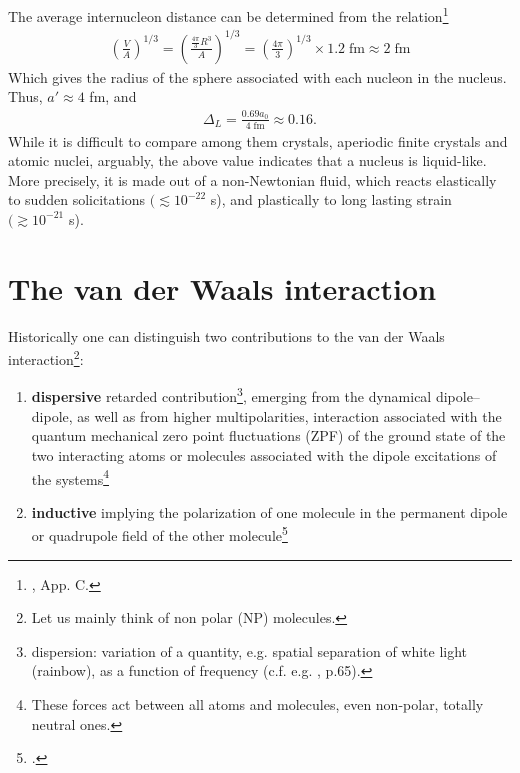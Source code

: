 \begin{subappendices}
The average internucleon distance can be determined from the relation\footnote{\cite{Brink:05}, App. C.}
\begin{align}
\left(\frac{V}{A}\right)^{1/3}=\left(\frac{\frac{4\pi}{3}R^3}{A}\right)^{1/3}=\left(\frac{4\pi}{3}\right)^{1/3}\times 1.2\; \text{fm}\approx 2\;\text{fm}
\end{align} 
Which gives the radius of the sphere associated with each nucleon in the nucleus. Thus, $a'\approx4$ fm, and 
\begin{align}
\Delta_L=\frac{0.69 a_0}{4\;\text{fm}}\approx0.16.
\end{align} 
While it is difficult to compare among them crystals, aperiodic finite crystals and atomic nuclei, arguably, the above value indicates that a nucleus is liquid-like. More precisely, it is made out of a non-Newtonian fluid, which reacts elastically to sudden so\-li\-ci\-ta\-tions $(\lesssim 10^{-22}$ s),  and plastically to long lasting strain $(\gtrsim 10^{-21}$ s). 

\section{The van der Waals interaction}\label{C2AppD}
Historically one can distinguish two contributions to the van der Waals interaction\footnote{Let us mainly think of non polar (NP) molecules.}: 
\begin{enumerate}
\item \textbf{dispersive} retarded contribution\footnote{dispersion: variation of a quantity, e.g. spatial separation of white light (rainbow), as a function of frequency (c.f. e.g. \cite{Israelachvili:85}, p.65).}, emerging from the dynamical dipole--dipole, as well as from higher multipolarities, interaction associated with the quantum mechanical zero point fluctuations (ZPF) of the ground state of the two interacting atoms or molecules associated with the dipole excitations of the systems\footnote{These forces act between all atoms and molecules, even non-polar, totally neutral ones.} 
\item \textbf{inductive} implying the polarization of one molecule in the permanent dipole or quadrupole field of the other molecule\footnote{\cite{Debye:20,Debye:21}.} 
\end{enumerate}


\end{subappendices}
